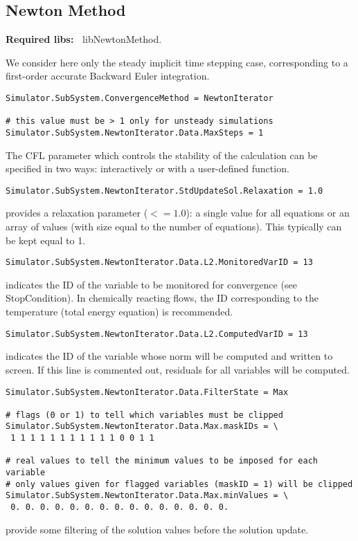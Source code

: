 \documentclass[11pt]{article}
\begin{document}
\subsection{Newton Method}

{\bf Required libs:~} libNewtonMethod.

We consider here only the steady implicit time stepping case, corresponding to a first-order accurate 
Backward Euler integration.

\begin{verbatim}
Simulator.SubSystem.ConvergenceMethod = NewtonIterator

# this value must be > 1 only for unsteady simulations
Simulator.SubSystem.NewtonIterator.Data.MaxSteps = 1
\end{verbatim}
The CFL parameter which controls the stability of the calculation can be specified in two ways: 
interactively or with a user-defined function.

\begin{verbatim}
Simulator.SubSystem.NewtonIterator.StdUpdateSol.Relaxation = 1.0
\end{verbatim}
provides a relaxation parameter ($<= 1.0$): a single value for all equations or an array of values (with size equal to the number of equations).
This typically can be kept equal to 1.

\begin{verbatim}
Simulator.SubSystem.NewtonIterator.Data.L2.MonitoredVarID = 13
\end{verbatim}
indicates the ID of the variable to be monitored for convergence (see StopCondition). In chemically reacting flows, 
the ID corresponding to the temperature (total energy equation) is recommended.
\begin{verbatim}
Simulator.SubSystem.NewtonIterator.Data.L2.ComputedVarID = 13
\end{verbatim}
indicates the ID of the variable whose norm will be computed and written to screen. If this line is commented out, residuals 
for all variables will be computed.

\begin{verbatim}
Simulator.SubSystem.NewtonIterator.Data.FilterState = Max

# flags (0 or 1) to tell which variables must be clipped
Simulator.SubSystem.NewtonIterator.Data.Max.maskIDs = \
 1 1 1 1 1 1 1 1 1 1 1 0 0 1 1

# real values to tell the minimum values to be imposed for each variable 
# only values given for flagged variables (maskID = 1) will be clipped
Simulator.SubSystem.NewtonIterator.Data.Max.minValues = \
 0. 0. 0. 0. 0. 0. 0. 0. 0. 0. 0. 0. 0. 0. 0.
\end{verbatim}
provide some filtering of the solution values before the solution update.  
\end{document}
